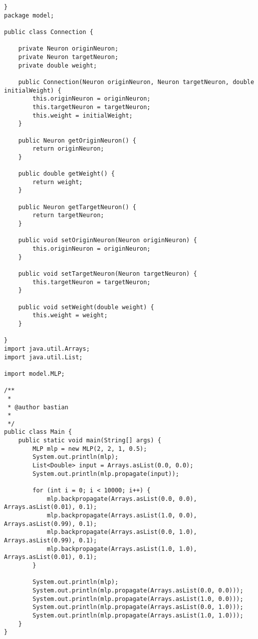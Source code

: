 \documentclass[paper=a4, fontsize=11pt]{scrartcl} %
\numberwithin{equation}{section} %
\numberwithin{figure}{section} %
\numberwithin{table}{section} %
\begin{document}
\begin{lstlisting}
}
package model;

public class Connection {

    private Neuron originNeuron;
    private Neuron targetNeuron;
    private double weight;

    public Connection(Neuron originNeuron, Neuron targetNeuron, double initialWeight) {
        this.originNeuron = originNeuron;
        this.targetNeuron = targetNeuron;
        this.weight = initialWeight;
    }

    public Neuron getOriginNeuron() {
        return originNeuron;
    }

    public double getWeight() {
        return weight;
    }

    public Neuron getTargetNeuron() {
        return targetNeuron;
    }

    public void setOriginNeuron(Neuron originNeuron) {
        this.originNeuron = originNeuron;
    }

    public void setTargetNeuron(Neuron targetNeuron) {
        this.targetNeuron = targetNeuron;
    }

    public void setWeight(double weight) {
        this.weight = weight;
    }

}
import java.util.Arrays;
import java.util.List;

import model.MLP;

/**
 * 
 * @author bastian
 * 
 */
public class Main {
    public static void main(String[] args) {
        MLP mlp = new MLP(2, 2, 1, 0.5);
        System.out.println(mlp);
        List<Double> input = Arrays.asList(0.0, 0.0);
        System.out.println(mlp.propagate(input));

        for (int i = 0; i < 10000; i++) {
            mlp.backpropagate(Arrays.asList(0.0, 0.0), Arrays.asList(0.01), 0.1);
            mlp.backpropagate(Arrays.asList(1.0, 0.0), Arrays.asList(0.99), 0.1);
            mlp.backpropagate(Arrays.asList(0.0, 1.0), Arrays.asList(0.99), 0.1);
            mlp.backpropagate(Arrays.asList(1.0, 1.0), Arrays.asList(0.01), 0.1);
        }

        System.out.println(mlp);
        System.out.println(mlp.propagate(Arrays.asList(0.0, 0.0)));
        System.out.println(mlp.propagate(Arrays.asList(1.0, 0.0)));
        System.out.println(mlp.propagate(Arrays.asList(0.0, 1.0)));
        System.out.println(mlp.propagate(Arrays.asList(1.0, 1.0)));
    }
}

\end{lstlisting}
\end{document}
